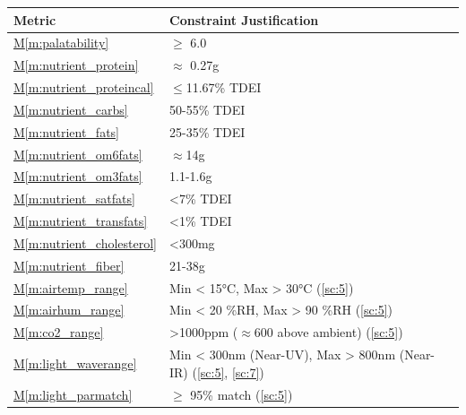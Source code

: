 \documentclass{report}
\newcommand{\mref}[1]{\hyperref[#1]{M\ref{#1}}}
\begin{document}
\begin{tabular}{|l|p{14.35cm}|}
    \hline
    \textbf{Metric} & \textbf{Constraint \hfill Justification} \\
    \hline
    \mref{m:palatability} & $\ge$ 6.0 \hfill \cite{applicantguide,dsfc-phase2}\\
    \hline
    \mref{m:nutrient_protein} & $\approx$ 0.27g \hfill \cite{applicantguide,dsfc-phase2,nutrition}\\
    \hline
    \mref{m:nutrient_proteincal} & $\le$11.67\% TDEI \hfill \cite{applicantguide,dsfc-phase2,nutrition}\\
    \hline
    \mref{m:nutrient_carbs} & 50-55\% TDEI \hfill \cite{applicantguide,dsfc-phase2,nutrition}\\
    \hline
    \mref{m:nutrient_fats} & 25-35\% TDEI \hfill \cite{applicantguide,dsfc-phase2,nutrition}\\
    \hline
    \mref{m:nutrient_om6fats} & $\approx$14g \hfill \cite{applicantguide,dsfc-phase2,nutrition}\\
    \hline
    \mref{m:nutrient_om3fats} & 1.1-1.6g \hfill \cite{applicantguide,dsfc-phase2,nutrition}\\
    \hline
    \mref{m:nutrient_satfats} & <7\% TDEI \hfill \cite{applicantguide,dsfc-phase2,nutrition}\\
    \hline
    \mref{m:nutrient_transfats} & <1\% TDEI \hfill \cite{applicantguide,dsfc-phase2,nutrition}\\
    \hline
    \mref{m:nutrient_cholesterol} & <300mg \hfill \cite{applicantguide,dsfc-phase2,nutrition}\\
    \hline
    \mref{m:nutrient_fiber} & 21-38g \hfill \cite{applicantguide,dsfc-phase2,nutrition}\\
    \hline
    \mref{m:airtemp_range} & Min < 15°C, Max > 30°C \hfill (\ref{sc:5})\\
    \hline
    \mref{m:airhum_range} & Min < 20 \%RH, Max > 90 \%RH \hfill (\ref{sc:5}) \\
    \hline
    \mref{m:co2_range} & >1000ppm ($\approx$600 above ambient) \hfill (\ref{sc:5}) \\
    \hline
    \mref{m:light_waverange} & Min < 300nm (Near-UV), Max > 800nm (Near-IR) \hfill (\ref{sc:5}, \ref{sc:7}) \\
    \hline
    \mref{m:light_parmatch} & $\ge$ 95\% match \hfill (\ref{sc:5}) \\
    \hline

\end{tabular}
\end{document}
